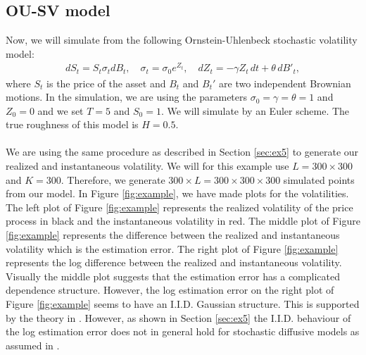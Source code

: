 \documentclass{article}
\begin{document}
\subsection{OU-SV model}
Now, we will simulate from the following Ornstein-Uhlenbeck stochastic volatility model:
\begin{align}
dS_t = S_t \sigma_t dB_t, \quad \sigma_t = \sigma_0 e^{Z_t}, \quad dZ_t = -\gamma Z_t \, dt + \theta \, dB'_t, \label{eq:ousv}
\end{align}
where $S_t$ is the price of the asset and $B_t$ and $B_t'$ are two independent Brownian motions. In the simulation, we are using the parameters $\sigma_0=\gamma=\theta=1$ and $Z_0=0$ and we set $T=5$ and $S_0=1$. We will simulate by an Euler scheme. The true roughness of this model is $H=0.5$.\\\\
We are using the same procedure as described in Section \ref{sec:ex5} to generate our realized and instantaneous volatility. We will for this example use $L=300\times 300$ and $K=300$. Therefore, we generate $300\times L=300\times 300 \times 300$ simulated points from our model. In Figure \ref{fig:example}, we have made plots for the volatilities. The left plot of Figure \ref{fig:example} represents the realized volatility of the price process in black and the instantaneous volatility in red. The middle plot of Figure \ref{fig:example} represents the difference between the realized and instantaneous volatility which is the estimation error. The right plot of Figure \ref{fig:example} represents the log difference between the realized and instantaneous volatility. Visually the middle plot suggests that the estimation error has a complicated dependence structure. However, the log estimation error on the right plot of Figure \ref{fig:example} seems to have an I.I.D. Gaussian structure. This is supported by the theory in \cite{fukasawa}. However, as shown in Section \ref{sec:ex5} the I.I.D. behaviour of the log estimation error does not in general hold for stochastic diffusive models as assumed in \cite{fukasawa}. 
\end{document}
